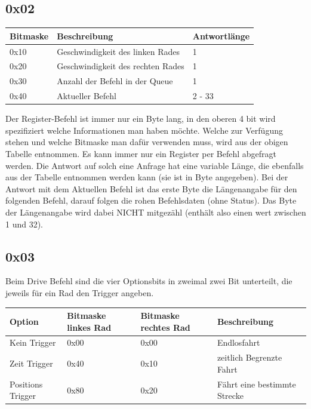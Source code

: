 \documentclass[a4paper]{article}
\begin{document}
	\subsection{0x02}

	\begin{tabularx}{\linewidth}{|l|l|X|}
		\hline
		\textbf{Bitmaske} & \textbf{Beschreibung} & \textbf{Antwortlänge} \\
		\hline
		\hline
		0x10 				& Geschwindigkeit des linken Rades & 1 \\
		\hline
		0x20				& Geschwindigkeit des rechten Rades & 1 \\
		\hline
		0x30				& Anzahl der Befehl in der Queue & 1 \\
		\hline
		0x40				& Aktueller Befehl & 2 - 33 \\
		\hline
	\end{tabularx}
	
	Der Register-Befehl ist immer nur ein Byte lang, in den oberen 4 bit wird spezifiziert welche Informationen man haben möchte.
	Welche zur Verfügung stehen und welche Bitmaske man dafür verwenden muss, wird aus der obigen Tabelle entnommen. Es kann immer
	nur ein Register per Befehl abgefragt werden. Die Antwort auf solch eine Anfrage hat eine variable Länge, die ebenfalls aus
	der Tabelle entnommen werden kann (sie ist in Byte angegeben).
	Bei der Antwort mit dem Aktuellen Befehl ist das erste Byte die Längenangabe für den folgenden Befehl, darauf folgen die
	rohen Befehlsdaten (ohne Status). Das Byte der Längenangabe wird dabei NICHT mitgezähl (enthält also einen wert zwischen 1 und
	32).

	\subsection{0x03}

	Beim Drive Befehl sind die vier Optionsbits in zweimal zwei Bit unterteilt, die jeweils für ein Rad den Trigger angeben.

	\begin{tabularx}{\linewidth}{|l|l|l|X|}
		\hline
		\textbf{Option} & \textbf{Bitmaske linkes Rad} & \textbf{Bitmaske rechtes Rad} & \textbf{Beschreibung} \\
		\hline
		\hline
		Kein Trigger	& 0x00						   & 0x00						   & Endlosfahrt \\
		\hline
		Zeit Trigger	& 0x40						   & 0x10						   & zeitlich Begrenzte Fahrt\\
		\hline
		Positions Trigger & 0x80					   & 0x20						   & Fährt eine bestimmte Strecke \\
		\hline
	\end{tabularx}
	
\end{document}
